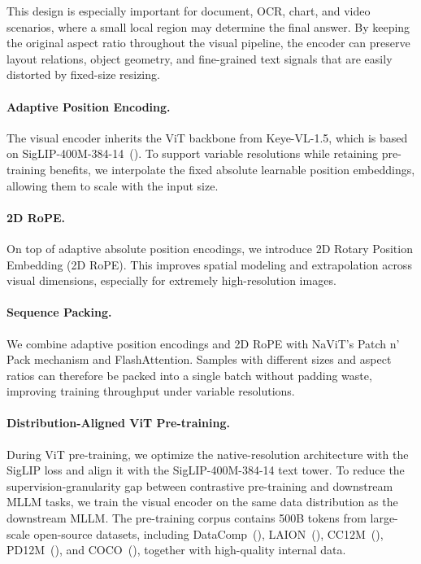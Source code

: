 \documentclass{article} %
\begin{document}
This design is especially important for document, OCR, chart, and video scenarios, where a small local region may determine the final answer. By keeping the original aspect ratio throughout the visual pipeline, the encoder can preserve layout relations, object geometry, and fine-grained text signals that are easily distorted by fixed-size resizing.

\paragraph{Adaptive Position Encoding.}
The visual encoder inherits the ViT backbone from Keye-VL-1.5, which is based on SigLIP-400M-384-14~(\cite{siglip}). To support variable resolutions while retaining pre-training benefits, we interpolate the fixed absolute learnable position embeddings, allowing them to scale with the input size.

\paragraph{2D RoPE.}
On top of adaptive absolute position encodings, we introduce 2D Rotary Position Embedding (2D RoPE). This improves spatial modeling and extrapolation across visual dimensions, especially for extremely high-resolution images.

\paragraph{Sequence Packing.}
We combine adaptive position encodings and 2D RoPE with NaViT's Patch n' Pack mechanism and FlashAttention. Samples with different sizes and aspect ratios can therefore be packed into a single batch without padding waste, improving training throughput under variable resolutions.

\paragraph{Distribution-Aligned ViT Pre-training.}
During ViT pre-training, we optimize the native-resolution architecture with the SigLIP loss and align it with the SigLIP-400M-384-14 text tower. To reduce the supervision-granularity gap between contrastive pre-training and downstream MLLM tasks, we train the visual encoder on the same data distribution as the downstream MLLM. The pre-training corpus contains 500B tokens from large-scale open-source datasets, including DataComp~(\cite{datacomp}), LAION~(\cite{laion}), CC12M~(\cite{cc12m}), PD12M~(\cite{pd12m}), and COCO~(\cite{coco}), together with high-quality internal data.
\end{document}
